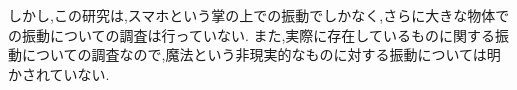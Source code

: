 しかし,この研究は,スマホという掌の上での振動でしかなく,さらに大きな物体での振動についての調査は行っていない.
また,実際に存在しているものに関する振動についての調査なので,魔法という非現実的なものに対する振動については明かされていない.


